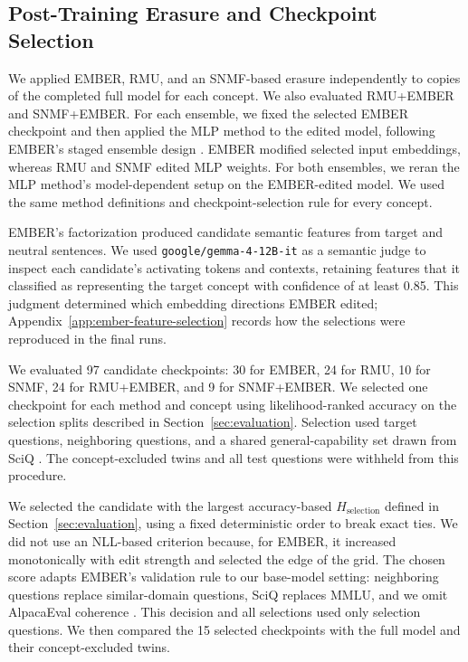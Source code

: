 \subsection{Post-Training Erasure and Checkpoint Selection}

We applied EMBER, RMU, and an SNMF-based erasure independently to copies of
the completed full model for each concept. We also evaluated RMU+EMBER and
SNMF+EMBER. For each ensemble, we fixed the selected EMBER checkpoint and
then applied the MLP method to the edited model, following EMBER's staged
ensemble design \citep{suslik2026ember}. EMBER modified selected input
embeddings, whereas RMU and SNMF edited MLP weights. For both ensembles, we
reran the MLP method's model-dependent setup on the EMBER-edited model. We
used the same method definitions and checkpoint-selection rule for every
concept.

EMBER's factorization produced candidate semantic features from target and
neutral sentences. We used \texttt{google/gemma-4-12B-it} as a semantic judge
\citep{gemmateam2026gemma4}
to inspect each candidate's activating tokens and contexts, retaining features
that it classified as representing the target concept with confidence of at
least 0.85. This judgment determined which embedding directions EMBER edited;
Appendix~\ref{app:ember-feature-selection} records how the selections were
reproduced in the final runs.

We evaluated 97 candidate checkpoints: 30 for EMBER, 24 for RMU,
10 for SNMF, 24 for RMU+EMBER, and 9 for SNMF+EMBER. We selected one
checkpoint for each method and concept using
likelihood-ranked accuracy on the selection splits described in
Section~\ref{sec:evaluation}. Selection used target questions,
neighboring questions, and a shared general-capability set drawn from
SciQ \citep{welbl2017sciq}. The concept-excluded twins and all test questions
were withheld from this procedure.

We selected the candidate with the largest accuracy-based
$H_{\mathrm{selection}}$ defined in Section~\ref{sec:evaluation}, using a fixed
deterministic order to break exact ties. We did not use an NLL-based criterion
because, for EMBER, it increased monotonically with edit strength and selected
the edge of the grid. The chosen score adapts EMBER's validation
rule to our base-model setting: neighboring questions replace similar-domain
questions, SciQ replaces MMLU, and we omit AlpacaEval coherence
\citep{suslik2026ember}. This decision and all selections used only selection
questions. We then compared the 15 selected checkpoints with the full model
and their concept-excluded twins.
